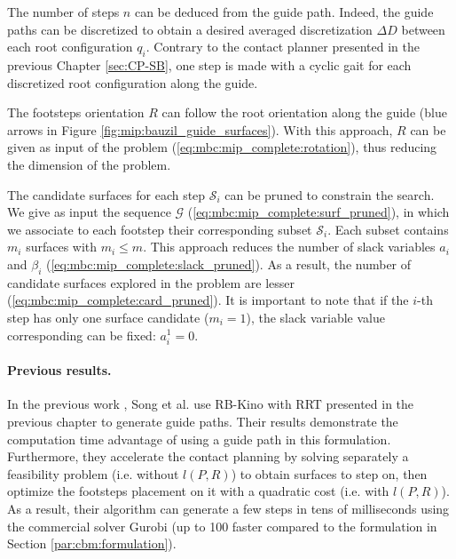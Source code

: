 The number of steps $n$ can be deduced from the guide path.
Indeed, the guide paths can be discretized to obtain a desired averaged discretization $\Delta D$ between each root configuration $q_i$.
Contrary to the contact planner presented in the previous Chapter \ref{sec:CP-SB}, one step is made with a cyclic gait for each discretized root configuration along the guide.

The footsteps orientation $R$ can follow the root orientation along the guide (blue arrows in Figure \ref{fig:mip:bauzil_guide_surfaces}).
With this approach, $R$ can be given as input of the problem (\ref{eq:mbc:mip_complete:rotation}), thus reducing the dimension of the problem.

The candidate surfaces for each step $\mathcal{S}_i$ can be pruned to constrain the search.
We give as input the sequence $\mathcal{G}$ (\ref{eq:mbc:mip_complete:surf_pruned}), in which we associate to each footstep their corresponding subset $\mathcal{S}_i$. Each subset contains $m_i$ surfaces with $m_i \leq m$. 
This approach reduces the number of slack variables $a_i$ and $\beta_i$ (\ref{eq:mbc:mip_complete:slack_pruned}).
As a result, the number of candidate surfaces explored in the problem are lesser (\ref{eq:mbc:mip_complete:card_pruned}).
It is important to note that if the $i$-th step has only one surface candidate ($m_i=1$), the slack variable value corresponding can be fixed: $a_i^1 = 0$.

\paragraph{Previous results.}
In the previous work \cite{sl1m_v2}, Song et al. use RB-Kino with RRT \cite{kinodynamic_sm_2017} presented in the previous chapter to generate guide paths.
Their results demonstrate the computation time advantage of using a guide path in this formulation. 
Furthermore, they accelerate the contact planning by solving separately a feasibility problem (i.e. without $l(P,R)$) to obtain surfaces to step on, then optimize the footsteps placement on it with a quadratic cost (i.e. with $l(P,R)$).
As a result, their algorithm can generate a few steps in tens of milliseconds using the commercial solver Gurobi \cite{gurobi} (up to 100 faster compared to the formulation in Section \ref{par:cbm:formulation}).

